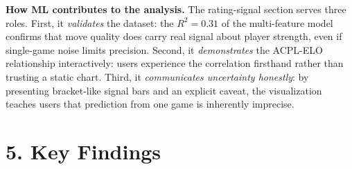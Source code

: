 \documentclass[a4paper]{article}
\begin{document}
\textbf{How ML contributes to the analysis.}
The rating-signal section serves three roles. First, it \emph{validates} the dataset: the $R^2 = 0.31$ of the multi-feature model confirms that move quality does carry real signal about player strength, even if single-game noise limits precision. Second, it \emph{demonstrates} the ACPL-ELO relationship interactively: users experience the correlation firsthand rather than trusting a static chart. Third, it \emph{communicates uncertainty honestly}: by presenting bracket-like signal bars and an explicit caveat, the visualization teaches users that prediction from one game is inherently imprecise.


\section*{5. Key Findings}
\end{document}
